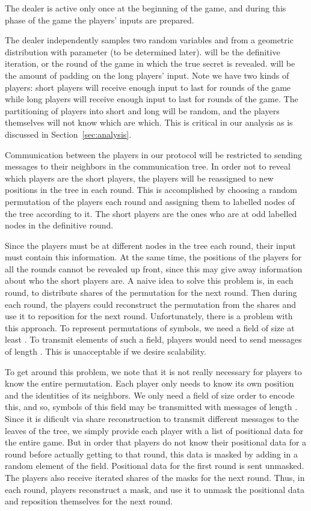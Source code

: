 \documentclass[12pt]{article}
\theoremstyle{definition}
\begin{document}
The dealer is active only once at the beginning of the game, and during 
this phase of the game the players' inputs are prepared.

The dealer independently samples two random variables  and  from 
a geometric distribution with parameter  (to be determined later). 
 will be the definitive iteration, or the round of the game in which 
the true secret is revealed.  will be the amount of padding on the 
long players' input. Note we have two kinds of players: short players 
will receive enough input to last for  rounds of the game while long 
players will receive enough input to last for  rounds of the game.
The partitioning of players into short and long will be random, and the 
players themselves will not know which are which. This is critical in 
our analysis as is discussed in Section~\ref{sec:analysis}.

Communication between the players in our protocol will be restricted 
to sending messages to their neighbors in the communication tree.  
In order not to reveal which players are the short players, the players 
will be reassigned to new positions in the tree in each round. This is 
accomplished by choosing a random permutation of the players each round 
and assigning them to labelled nodes of the tree according to it.
The short players are the ones who are at odd labelled nodes in the 
definitive round. 

Since the players must be at different nodes in the tree each round, their 
input must contain this information. At the same time, the positions of the 
players for all the rounds cannot be revealed up front, since this may give 
away information about who the short players are. A naive idea to solve this 
problem is, in each round, to distribute shares of the permutation for the 
next round. Then 
during each round, the players could reconstruct the permutation from the 
shares and use it to reposition for the next round. Unfortunately, there 
is a problem with this approach. To represent permutations of  symbols, 
we need a field of size at least . To transmit elements of such a field,
players would need to send messages of length .
This is unacceptable if we desire scalability. 

To get around this problem, we note that it is not really necessary for 
players to know the entire permutation. Each player only needs to know 
its own position and the identities of its neighbors. We only need a field 
of size order  to encode this, and so, symbols of this field may be 
transmitted with messages of length . Since it is dificult 
via share reconstruction to transmit different messages to the leaves of 
the tree, we simply provide each player with a list of positional data for the 
entire game. But in order that players do not know their positional data 
for a round before actually getting to that round, this data is masked 
by adding in a random element of the field. Positional data for the first 
round is sent unmasked. The players also receive iterated shares of the masks
for the next round. Thus, in each round, players reconstruct a mask, and use it 
to unmask the positional data and reposition themselves for the next round.
\end{document}
